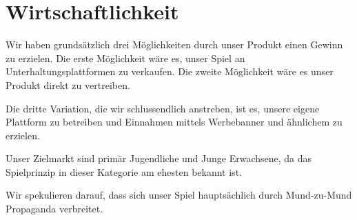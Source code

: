 \section{Wirtschaftlichkeit}
Wir haben grundsätzlich drei Möglichkeiten durch unser Produkt einen Gewinn zu erzielen. Die erste Möglichkeit wäre es, unser Spiel an Unterhaltungsplattformen zu verkaufen. Die zweite Möglichkeit wäre es unser Produkt direkt zu vertreiben.

Die dritte Variation, die wir schlussendlich anstreben, ist es, unsere eigene Plattform zu betreiben und Einnahmen mittels Werbebanner und ähnlichem zu erzielen.

Unser Zielmarkt sind primär Jugendliche und Junge Erwachsene, da das Spielprinzip in dieser Kategorie am ehesten bekannt ist.

Wir spekulieren darauf, dass sich unser Spiel hauptsächlich durch Mund-zu-Mund Propaganda verbreitet.


